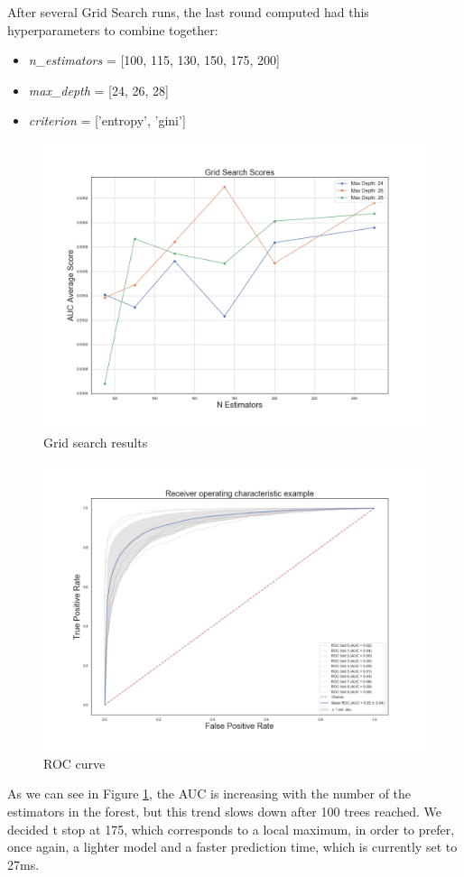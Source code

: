 After several Grid Search runs, the last round computed had this hyperparameters to combine together:
\begin{itemize}
	\item[\PencilRight] \textit{n\_estimators} = [100, 115, 130, 150, 175, 200]
	\item[\PencilRight]\textit{max\_depth} = [24, 26, 28]
	\item[\PencilRight]\textit{criterion} = ['entropy', 'gini']
\end{itemize}
\begin{figure}[htp!]
	\centering
	\includegraphics[width=\columnwidth]{chapter5/figure/gridSearch.png}
	\caption{Grid search results}
	\label{fig:grid_search}
\end{figure}
\begin{figure}[htp!]
	\centering
	\includegraphics[width=\columnwidth]{chapter5/figure/auc.png}
	\caption{ROC curve}
	\label{fig:auc}
\end{figure}
As we can see in Figure \ref{fig:grid_search}, the AUC is increasing with the number of the estimators in the forest, but this trend slows down after 100 trees reached. We decided t stop at 175, which corresponds to a local maximum, in order to prefer, once again, a lighter model and a faster prediction time, which is currently set to 27ms.

